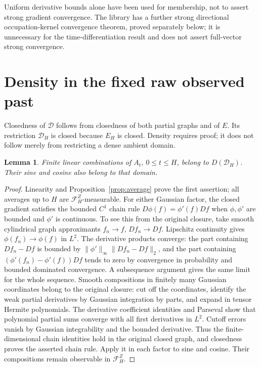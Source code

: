 \documentclass[11pt]{article}
\newtheorem{lemma}[theorem]{Lemma}
\newcommand{\D}{\mathcal D}\newcommand{\G}{\mathcal G}
\begin{document}
Uniform derivative bounds alone have been used for membership, not to
assert strong gradient convergence. The library has a further strong
directional occupation-kernel convergence theorem, proved separately below;
it is unnecessary for the time-differentiation result and does not assert
full-vector strong convergence.

\section{Density in the fixed raw observed past}
Closedness of $\D$ follows from closedness of both partial graphs and of
$E$. Its restriction $\D_H$ is closed because $E_H$ is closed. Density
requires proof; it does not follow merely from restricting a dense
ambient domain.

\begin{lemma}\label{lem:chain}
Finite linear combinations of $A_t$, $0\leq t\leq H$, belong to
$D(\D_H)$. Their sine and cosine also belong to that domain.
\end{lemma}
\begin{proof}
Linearity and Proposition~\ref{prop:average} prove the first assertion;
all averages up to $H$ are $\mathcal F_H^Z$-measurable. For either
Gaussian factor, the closed gradient satisfies the bounded $C^1$ chain
rule $D\phi(f)=\phi'(f)Df$ when $\phi,\phi'$ are bounded and $\phi'$
is continuous. To see this from the original closure, take smooth
cylindrical graph approximants $f_n\to f$, $Df_n\to Df$. Lipschitz
continuity gives $\phi(f_n)\to\phi(f)$ in $L^2$. The derivative
products converge: the part containing $Df_n-Df$ is bounded by
$\|\phi'\|_\infty\|Df_n-Df\|_2$, and the part containing
$(\phi'(f_n)-\phi'(f))Df$ tends to zero by convergence in probability
and bounded dominated convergence. A subsequence argument gives the
same limit for the whole sequence. Smooth compositions in finitely many
Gaussian coordinates belong to the original closure: cut off the
coordinates, identify the weak partial derivatives by Gaussian
integration by parts, and expand in tensor Hermite polynomials. The
derivative coefficient identities and Parseval show that polynomial
partial sums converge with all first derivatives in $L^2$. Cutoff errors
vanish by Gaussian integrability and the bounded derivative. Thus the
finite-dimensional chain identities hold in the original closed graph,
and closedness proves the asserted chain rule. Apply it in each factor
to sine and cosine. Their
compositions remain observable in $\mathcal F_H^Z$.
\end{proof}
\end{document}

